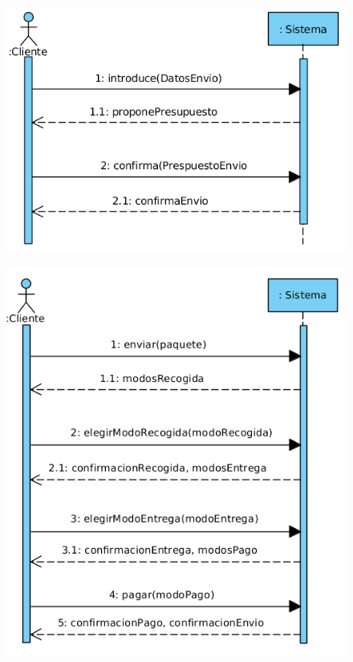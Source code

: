 \begin{figure}[H]
	\centering
	\includegraphics[width=16cm]{39}
\end{figure}
\begin{figure}[H]
	\centering
	\includegraphics[width=16cm]{40}
\end{figure}
